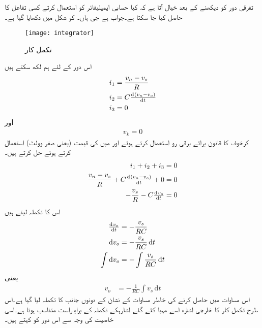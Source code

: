 تفرقی دور کو دیکھنے کے بعد خیال آتا ہے کہ کیا حسابی ایمپلیفائر کو استعمال کرتے کسی تفاعل کا  حاصل کیا جا سکتا ہے۔جواب ہے جی ہاں۔  کو شکل   میں دکھایا گیا ہے۔
\begin{figure}
\centering
\texttt{[image: integrator]}
\caption{تکمل کار}
\label{شکل_تکمل_کار}
\end{figure}
اس دور کے لئے ہم لکھ سکتے ہیں
\begin{gather}
\begin{aligned}
i_1 & = \frac{v_n-v_s}{R} \\
i_2 &= C \od{ (v_n-v_o )}{t} \\
i_3&=0
\end{aligned}
\end{gather}
اور
\begin{align}
v_k =0
\end{align}
کرخوف کا قانون برائے برقی رو استعمال کرتے ہوئے اور   میں  کی قیمت (یعنی صفر وولٹ) استعمال کرتے ہوئے حل کرتے ہیں۔
\begin{align*}
i_1+i_2+i_3&=0  \\
\frac{v_n-v_s}{R}+C \od{(v_n-v_o)}{t}+0&=0\\
-\frac{v_s}{R}-C\od{v_o}{t}&=0
\end{align*}
اس کا تکملہ لیتے ہیں
\begin{align*}
\od{v_o}{t}&=-\frac{v_s}{RC}\\
\mathrm{d}v_o&=-\frac{v_s}{RC} \, \mathrm{d}t\\
\int {\mathrm{d}v_o} & =-\int \frac{v_s}{RC} \, \mathrm{d}t
\end{align*}
یعنی
\begin{align} \label{مساوات_حسابی_تکمل_کار}
v_o&=-\frac{1}{RC} \int v_s \, \mathrm{d}t 
\end{align}
اس مساوات میں  حاصل کرنے کی خاطر مساوات کے نشان کے دونوں جانب کا تکملہ لیا گیا ہے۔اس طرح تکمل کار کا خارجی اشارہ   اسے مہیا کئے گئے اشارہکے تکملہ کے براہِ راست متناسب ہوتا ہے۔اسی خاصیت کی وجہ سے اس دور کو   کہتے ہیں۔

